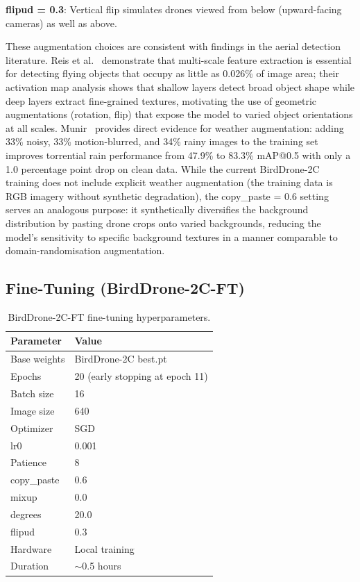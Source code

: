 \documentclass[12pt,a4paper]{report}
\begin{document}
\textbf{flipud = 0.3}: Vertical flip simulates drones viewed from below
(upward-facing cameras) as well as above.

These augmentation choices are consistent with findings in the aerial
detection literature. Reis et al.~\cite{reis2024yolov8} demonstrate that
multi-scale feature extraction is essential for detecting flying objects
that occupy as little as 0.026\% of image area; their activation map
analysis shows that shallow layers detect broad object shape while deep
layers extract fine-grained textures, motivating the use of geometric
augmentations (rotation, flip) that expose the model to varied object
orientations at all scales. Munir~\cite{munir2023kfupm} provides direct
evidence for weather augmentation: adding 33\% noisy, 33\% motion-blurred,
and 34\% rainy images to the training set improves torrential rain
performance from 47.9\% to 83.3\% mAP@0.5 with only a 1.0 percentage
point drop on clean data. While the current BirdDrone-2C training does
not include explicit weather augmentation (the training data is RGB
imagery without synthetic degradation), the copy\_paste = 0.6 setting
serves an analogous purpose: it synthetically diversifies the background
distribution by pasting drone crops onto varied backgrounds, reducing
the model's sensitivity to specific background textures in a manner
comparable to domain-randomisation augmentation.

\subsection{Fine-Tuning (BirdDrone-2C-FT)}

\begin{table}[H]
\centering
\caption{BirdDrone-2C-FT fine-tuning hyperparameters.}
\begin{tabular}{|l|l|}
\hline
\textbf{Parameter} & \textbf{Value} \\
\hline
Base weights & BirdDrone-2C best.pt \\
\hline
Epochs       & 20 (early stopping at epoch 11) \\
\hline
Batch size   & 16 \\
\hline
Image size   & 640 \\
\hline
Optimizer    & SGD \\
\hline
lr0          & 0.001 \\
\hline
Patience     & 8 \\
\hline
copy\_paste  & 0.6 \\
\hline
mixup        & 0.0 \\
\hline
degrees      & 20.0 \\
\hline
flipud       & 0.3 \\
\hline
Hardware     & Local training \\
\hline
Duration     & $\sim$0.5 hours \\
\hline
\end{tabular}
\end{table}
\end{document}

